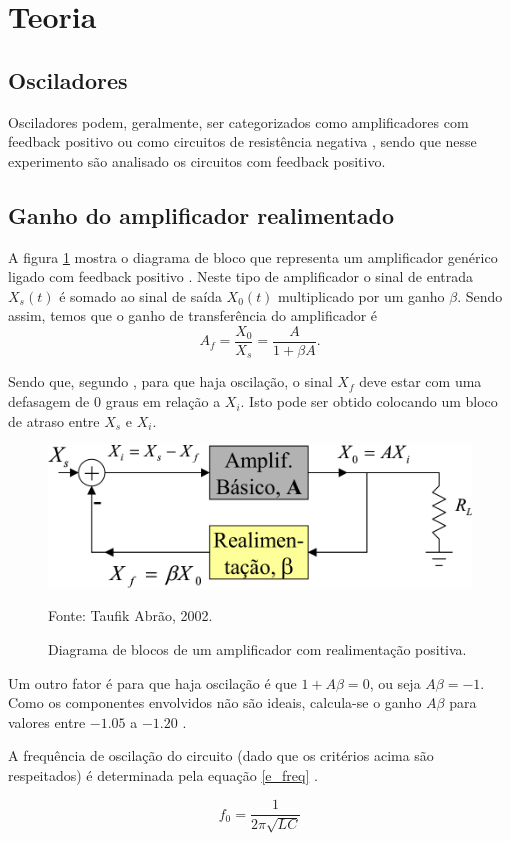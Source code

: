 \newpage
\section{Teoria}
\subsection{Osciladores}
Osciladores podem, geralmente, ser categorizados como amplificadores com feedback positivo ou como circuitos de resistência negativa \citep{Rhea}, sendo que nesse experimento são analisado os circuitos com feedback positivo.

\subsection{Ganho do amplificador realimentado}
A figura \ref{f_gain} mostra o diagrama de bloco que representa um amplificador genérico ligado com feedback positivo \citep{abrao, Rhea}.
Neste tipo de amplificador o sinal de entrada $X_s(t)$ é somado ao sinal de saída $X_0(t)$ multiplicado por um ganho $\beta$. Sendo assim, temos que o ganho de transferência do amplificador é 
\[
A_f = \frac{X_0}{X_s} = \frac{A}{1+\beta A}.
\]

Sendo que, segundo \cite{abrao}, para que haja oscilação, o sinal $X_f$ deve estar com uma defasagem de 0 graus em relação a $X_i$. Isto pode ser obtido colocando um bloco de atraso entre $X_s$ e $X_i$.

\begin{figure}[H]
\centering
\caption{Diagrama de blocos de um amplificador com realimentação positiva.}\label{f_gain}
\includegraphics[scale=0.5]{Imagens/gain.png}

\small Fonte: Taufik Abrão, 2002.
\end{figure}

Um outro fator é para que haja oscilação é que $1+A\beta = 0$, ou seja $A\beta = -1$. Como os componentes envolvidos não são ideais, calcula-se o ganho $A\beta$ para valores entre $-1.05$ a $-1.20$ \citep{abrao}.

A frequência de oscilação do circuito (dado que os critérios acima são respeitados) é determinada pela equação \ref{e_freq} \citep{abrao}.

\begin{equation}
f_0 = \frac{1}{2\pi\sqrt{LC}}
\label{e_freq}
\end{equation}
